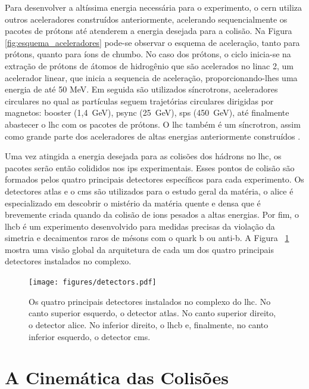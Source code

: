 Para desenvolver a altíssima energia necessária para o experimento, o \gls{cern}
utiliza outros aceleradores construídos anteriormente, acelerando sequencialmente os pacotes 
de prótons até atenderem a energia desejada para a colisão. Na Figura \ref{fig:esquema_aceleradores} 
pode-se observar o esquema de aceleração, tanto para prótons, quanto para íons de chumbo. 
No caso dos prótons, o ciclo inicia-se na extração de prótons de átomos de hidrogênio que são
acelerados no \acrshort{linac} 2, um acelerador linear, que inicia a sequencia de aceleração, 
proporcionando-lhes uma energia de até 50 MeV.  Em seguida são utilizados síncrotrons, aceleradores 
circulares no qual as partículas seguem trajetórias circulares dirigidas por magnetos: \acrshort{booster} (1,4~GeV), 
\acrshort{psync} (25~GeV), \acrshort{sps} (450~GeV), até finalmente abastecer o \gls{lhc} com os pacotes 
de prótons. O \gls{lhc} também é um síncrotron, assim como grande parte dos aceleradores de altas 
energias anteriormente construídos \cite{lecture_slides_1,lecture_slides_2}.

Uma vez atingida a energia desejada para as colisões dos hádrons no \gls{lhc}, os pacotes serão então 
colididos nos \glspl{ip} experimentais. Esses pontos de colisão são formados pelos quatro principais detectores específicos 
para cada experimento. Os detectores \gls{atlas} e o \gls{cms} são utilizados para o estudo geral da matéria, o \gls{alice} 
é especializado em descobrir o mistério da matéria quente e densa que é brevemente criada quando da colisão de ions 
pesados a altas energias. Por fim, o \gls{lhcb} é um experimento desenvolvido para medidas precisas da violação da simetria 
e decaimentos raros de mésons com o quark b ou anti-b. A Figura ~\ref{fig:detectores} mostra uma visão global da 
arquitetura de cada um dos quatro principais detectores instalados no complexo. 

\begin{figure}[h!t]
\centering
\texttt{[image: figures/detectors.pdf]}
\caption[Os detectores do LHC.]{
Os quatro principais detectores instalados no complexo do \gls{lhc}. No canto superior esquerdo, o detector 
 \gls{atlas}. No canto superior direito, o detector \gls{alice}. No inferior direito, o \gls{lhcb} e, finalmente, no
 canto inferior esquerdo, o detector \gls{cms}.}
\label{fig:detectores}
\end{figure}

\newpage

\section{A Cinemática das Colisões}
\label{sssec:cinematica}

